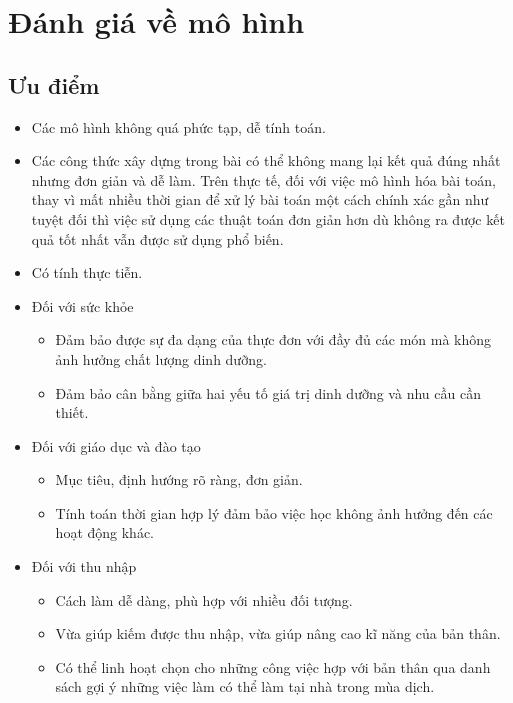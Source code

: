 \section{Đánh giá về mô hình}
\subsection{Ưu điểm}
\begin{itemize}
    \item Các mô hình không quá phức tạp, dễ tính toán.
    \item Các công thức xây dựng trong bài có thể không mang lại kết quả đúng nhất nhưng đơn giản và dễ làm. Trên thực tế, đối với việc mô hình hóa bài toán, thay vì mất nhiều thời gian để xử lý bài toán một cách chính xác gần như tuyệt đối thì việc sử dụng các thuật toán đơn giản hơn dù không ra được kết quả tốt nhất vẫn được sử dụng phổ biến.
    \item Có tính thực tiễn.
    \item Đối với sức khỏe
    \begin{itemize}
        \item Đảm bảo được sự đa dạng của thực đơn với đầy đủ các món mà không ảnh hưởng chất lượng dinh dưỡng.
        \item Đảm bảo cân bằng giữa hai yếu tố giá trị dinh dưỡng và nhu cầu cần thiết.
    \end{itemize}
    \item Đối với giáo dục và đào tạo
    \begin{itemize}
        \item Mục tiêu, định hướng rõ ràng, đơn giản.
        \item Tính toán thời gian hợp lý đảm bảo việc học không ảnh hưởng đến các hoạt động khác.
    \end{itemize}
    \item Đối với thu nhập
    \begin{itemize}
        \item Cách làm dễ dàng, phù hợp với nhiều đối tượng.
        \item Vừa giúp kiếm được thu nhập, vừa giúp nâng cao kĩ năng của bản thân.
        \item Có thể linh hoạt chọn cho những công việc hợp với bản thân qua danh sách gợi ý những việc làm có thể làm tại nhà trong mùa dịch.
    \end{itemize}
\end{itemize}
